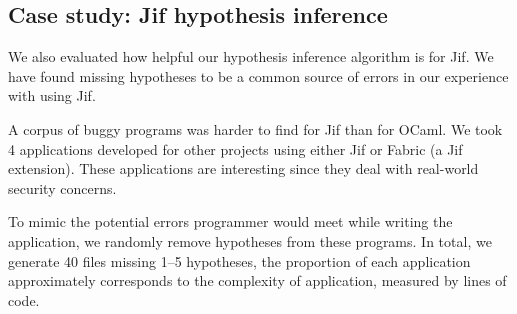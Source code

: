 \begin{table}
\caption{Performance results}
\end{table}
\fi

\subsection{Case study: Jif hypothesis inference}
\label{sec:jifeval}
We also evaluated how helpful our hypothesis inference algorithm is
for Jif. We have found missing hypotheses to be a common
source of errors in our experience with using Jif.

A corpus of buggy programs was harder to find for Jif than for OCaml.
We took 4 applications developed for other projects using either Jif
or Fabric (a Jif extension). These applications are interesting since
they deal with real-world security concerns.

To mimic the potential errors programmer would meet while writing the
application, we randomly remove hypotheses from these programs. In
total, we generate 40 files missing 1--5 hypotheses, the proportion of
each application approximately corresponds to the complexity of
application, measured by lines of code.


